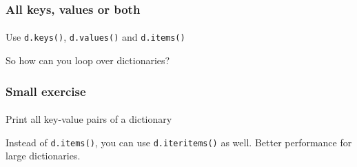


\begin{frame}\frametitle{All keys, values or both}
    \framesubtitle{}

    Use \texttt{d.keys()}, \texttt{d.values()} and \texttt{d.items()}


    So how can you loop over dictionaries?

\end{frame}

\begin{frame}\frametitle{Small exercise}
    \framesubtitle{}

    Print all key-value pairs of a dictionary

    \pause


    Instead of \texttt{d.items()}, you can use \texttt{d.iteritems()} as well.
    Better performance for large dictionaries.

\end{frame}

